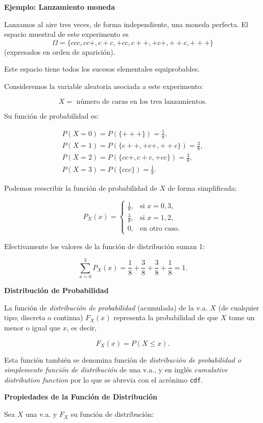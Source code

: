 \documentclass[]{book}
\begin{document}
\textbf{Ejemplo: Lanzamiento moneda}

Lanzamos al aire tres veces, de forma independiente, una moneda perfecta. El espacio muestral de este experimento es
\[\Omega=\{ccc,cc+,c+c,+cc,c++,+c+,++c,+++\}\] (expresados en orden de aparición).

Este espacio tiene todos los sucesos elementales equiprobables.

Consideremos la variable aleatoria asociada a este experimento:

\[X=\mbox{ número de caras en los tres lanzamientos}.\]

Su función de probabilidad es:

\[
\begin{array}{l}
P(X=0)=P(\{+++\})=\frac18,\\ P(X=1)=P(\{c++,+c+,++c\})=\frac38,\\
    P(X=2)=P(\{cc+,c+c,+cc\})=\frac38,\\
    P(X=3)=P(\{ccc\})=\frac18.
\end{array}
\]

Podemos reescribir la función de probabilidad de \(X\) de forma simplificada:

\[P_{X}(x)=\left\{\begin{array}{ll} \frac18, & \mbox{si } x=0, 3,\\[1ex]
\frac38, & \mbox{si } x=1,2,\\[1ex] 0, & \mbox{en otro caso.}\end{array}\right.\]

Efectivamente los valores de la función de distribución suman 1:

\[\sum_{x=0}^3 P_X(x)= \frac18+\frac38+\frac38+\frac18=1.\]

\textbf{Distribución de Probabilidad}

La función de \emph{distribución de probabilidad} (acumulada) de la v.a. \(X\) (de cualquier tipo; discreta o continua) \(F_{X}(x)\) representa la probabilidad de que \(X\) tome un menor o igual que \(x\), es decir,

\[F_{X}(x)=P(X\leq x).\]

Esta función también se denomina función de \emph{distribución de
probabilidad o simplemente función de distribución} de una v.a., y en inglés
\emph{cumulative distribution function} por lo que se abrevia con el acrónimo \texttt{cdf}.

\textbf{Propiedades de la Función de Distribución}

Sea \(X\) una v.a. y \(F_{X}\) su función de distribución:
\end{document}
